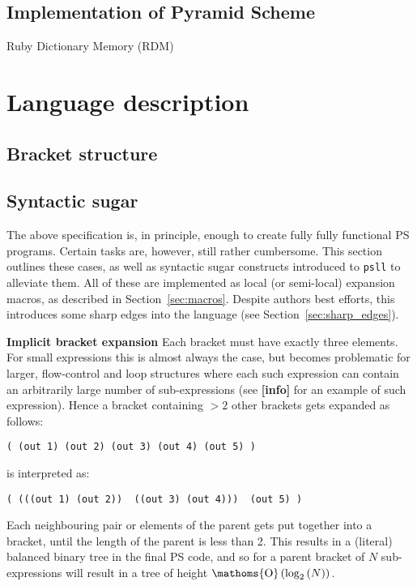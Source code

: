 \documentclass[aip,jcp,reprint]{revtex4-1}
\DeclareMathOperator{\bigO}{\ensuremath{\mathoms{O}}}
\newcommand\plinfo{{\color[rgb]{0.929,0.694,0.125}\textbf{[info]}}\xspace}
\newcommand\psll{\texttt{psll}\xspace}
\begin{document}
\subsection{Implementation of Pyramid Scheme}

Ruby Dictionary Memory (RDM)

\cite{dbeaz2018}

\lipsum[1-5]

\section{Language description}
\subsection{Bracket structure}

\subsection{Syntactic sugar}\label{sec:sugar}
The above specification is, in principle, enough to create fully fully functional PS programs. Certain tasks are, however, still rather cumbersome. This section outlines these cases, as well as syntactic sugar constructs introduced to \psll to alleviate them. All of these are implemented as local (or semi-local) expansion macros, as described in Section~\ref{sec:macros}. Despite authors best efforts, this introduces some sharp edges into the language (see Section~\ref{sec:sharp_edges}).

\textbf{Implicit bracket expansion} Each bracket must have exactly three elements. For small expressions this is almost always the case, but becomes problematic for larger, flow-control and loop structures where each such expression can contain an arbitrarily large number of sub-expressions (see \plinfo for an example of such expression). Hence a bracket containing $>2$ other brackets gets expanded as follows:
\begin{lstlisting}[language=psll,aboveskip=3pt,belowskip=-2pt]
( (out 1) (out 2) (out 3) (out 4) (out 5) )
\end{lstlisting}
is interpreted as:
\begin{lstlisting}[language=psll,aboveskip=3pt,belowskip=-2pt]
( (((out 1) (out 2))  ((out 3) (out 4)))  (out 5) )
\end{lstlisting}
Each neighbouring pair or elements of the parent gets put together into a bracket, until the length of the parent is less than 2. This results in a (literal) balanced binary tree in the final PS code, and so for a parent bracket of $N$ sub-expressions will result in a tree of height $\bigO\left(\log_2\left(N\right)\right)$.
\end{document}
